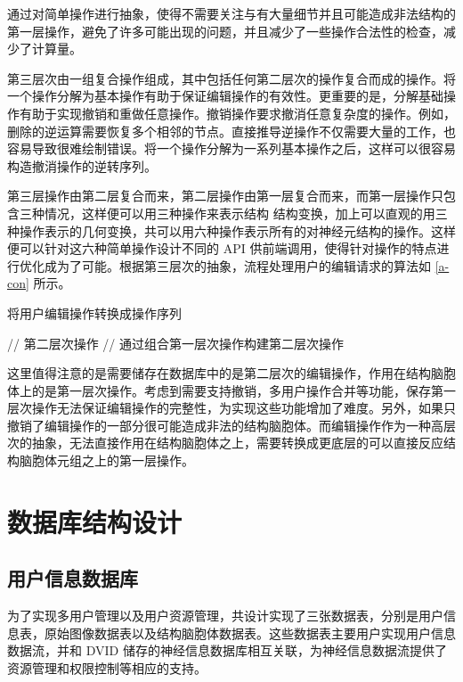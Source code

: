 通过对简单操作进行抽象，使得不需要关注与有大量细节并且可能造成非法结构的第一层操作，避免了许多可能出现的问题，并且减少了一些操作合法性的检查，减少了计算量。

第三层次由一组复合操作组成，其中包括任何第二层次的操作复合而成的操作。将一个操作分解为基本操作有助于保证编辑操作的有效性。更重要的是，分解基础操作有助于实现撤销和重做任意操作。撤销操作要求撤消任意复杂度的操作。例如，删除的逆运算需要恢复多个相邻的节点。直接推导逆操作不仅需要大量的工作，也容易导致很难绘制错误。将一个操作分解为一系列基本操作之后，这样可以很容易构造撤消操作的逆转序列。

第三层操作由第二层复合而来，第二层操作由第一层复合而来，而第一层操作只包含三种情况，这样便可以用三种操作来表示结构
结构变换，加上可以直观的用三种操作表示的几何变换，共可以用六种操作表示所有的对神经元结构的操作。这样便可以针对这六种简单操作设计不同的 API 供前端调用，使得针对操作的特点进行优化成为了可能。根据第三层次的抽象，流程处理用户的编辑请求的算法如 \ref{a-con} 所示。

\begin{algorithm}
  \label{a-con}
  \caption{将用户编辑操作转换成操作序列}
  \begin{algorithmic}[1] %
              // 第二层次操作
    \ELSE
           // 通过组合第一层次操作构建第二层次操作
      \ENDWHILE
    \ENDIF
  \end{algorithmic}
\end{algorithm}

这里值得注意的是需要储存在数据库中的是第二层次的编辑操作，作用在结构脑胞体上的是第一层次操作。考虑到需要支持撤销，多用户操作合并等功能，保存第一层次操作无法保证编辑操作的完整性，为实现这些功能增加了难度。另外，如果只撤销了编辑操作的一部分很可能造成非法的结构脑胞体。而编辑操作作为一种高层次的抽象，无法直接作用在结构脑胞体之上，需要转换成更底层的可以直接反应结构脑胞体元组之上的第一层操作。

\section{数据库结构设计}

\subsection{用户信息数据库}
为了实现多用户管理以及用户资源管理，共设计实现了三张数据表，分别是用户信息表，原始图像数据表以及结构脑胞体数据表。这些数据表主要用户实现用户信息数据流，并和 DVID 储存的神经信息数据库相互关联，为神经信息数据流提供了资源管理和权限控制等相应的支持。

